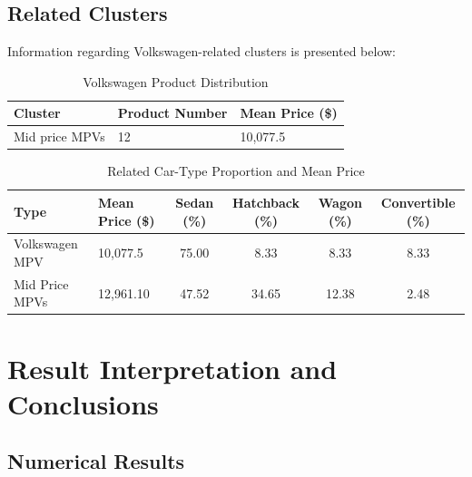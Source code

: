 \documentclass{article}
\begin{document}
\subsection{Related Clusters}
Information regarding Volkswagen-related clusters is presented below:

\begin{table}[H]
    \centering
    \caption{Volkswagen Product Distribution}
    \begin{tabular}{lll}
        \toprule
        \textbf{Cluster} & \textbf{Product Number} & \textbf{Mean Price (\$)} \\
        \midrule
        Mid price MPVs   & 12                      & 10,077.5                 \\
        \bottomrule
    \end{tabular}
\end{table}

\begin{table}[H]
    \centering
    \small
    \caption{Related Car-Type Proportion and Mean Price}
    \begin{tabular}{llcccc}
        \toprule
        \textbf{Type}  & \textbf{Mean Price (\$)} & \textbf{Sedan (\%)} & \textbf{Hatchback (\%)} & \textbf{Wagon (\%)} & \textbf{Convertible (\%)} \\
        \midrule
        Volkswagen MPV & 10,077.5                 & 75.00               & 8.33                    & 8.33                & 8.33                      \\
        Mid Price MPVs & 12,961.10                & 47.52               & 34.65                   & 12.38               & 2.48                      \\
        \bottomrule
    \end{tabular}
\end{table}

\section{Result Interpretation and Conclusions}

\subsection{Numerical Results}
\end{document}
